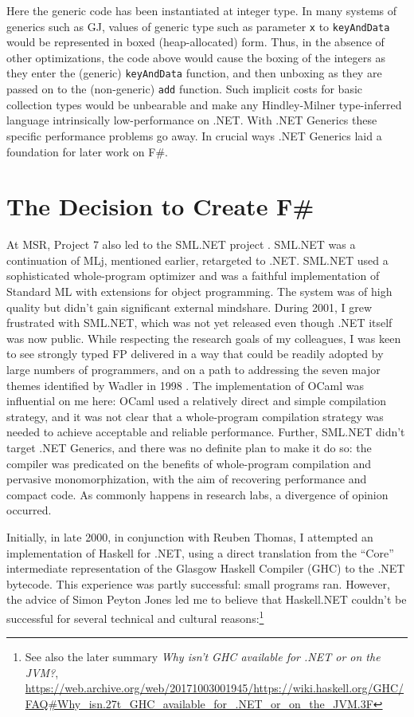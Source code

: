 \documentclass[acmsmall]{acmart}\settopmatter{}
\begin{document}
Here the generic code has been instantiated at integer type. In many systems of generics such as GJ, values of generic type such as
parameter \texttt{x} to \texttt{keyAndData} would be represented in boxed (heap-allocated) form.  Thus, in the absence of other optimizations, the code
above would cause the boxing of the integers as they enter the (generic) \texttt{keyAndData} function, and then unboxing as they are passed on
to the (non-generic) \texttt{add} function.  Such implicit costs for basic collection types would be unbearable and make any Hindley-Milner type-inferred language
intrinsically low-performance on .NET. With .NET Generics these specific performance problems go away.  In crucial ways .NET Generics laid a foundation for later work on F\#.


\section*{The Decision to Create F\#}

At MSR, Project 7 also led to the SML.NET project \citep{Benton2004}.  SML.NET was a continuation of MLj, mentioned earlier, retargeted to
.NET.  SML.NET used a sophisticated whole-program optimizer and was a faithful implementation of Standard ML
with extensions for object programming. The system was of high quality but didn’t gain significant external mindshare.   During 2001, I grew frustrated with SML.NET,
which was not yet released even though .NET itself was now public. While respecting the research goals of my colleagues, I was keen to see strongly typed FP delivered
in a way that could be readily adopted by large numbers of programmers, and on a path to addressing the seven major themes identified by Wadler in 1998 \citep{Wadler1998}.  The
implementation of OCaml was influential on me here: OCaml used a relatively direct and simple compilation strategy, and it was not clear that a whole-program
compilation strategy was needed to achieve acceptable and reliable performance.  Further, SML.NET didn’t target .NET Generics, and there was no definite plan to
make it do so: the compiler was predicated on the benefits of whole-program compilation and pervasive monomorphization, with the aim of recovering performance
and compact code.  As commonly happens in research labs, a divergence of opinion occurred.


Initially, in late 2000, in conjunction with Reuben Thomas, I attempted an implementation of Haskell for .NET, using a direct translation from the “Core” intermediate
representation of the Glasgow Haskell Compiler (GHC) to the .NET bytecode. This experience was partly successful: small programs ran. However, the advice of Simon
Peyton Jones led me to believe that Haskell.NET couldn’t be successful for several technical and cultural reasons:\footnote{See also the later
summary \textit{Why isn't GHC available for .NET or on the JVM?}, \url{https://web.archive.org/web/20171003001945/https://wiki.haskell.org/GHC/FAQ\#Why_isn.27t_GHC_available_for_.NET_or_on_the_JVM.3F}} 
\end{document}
